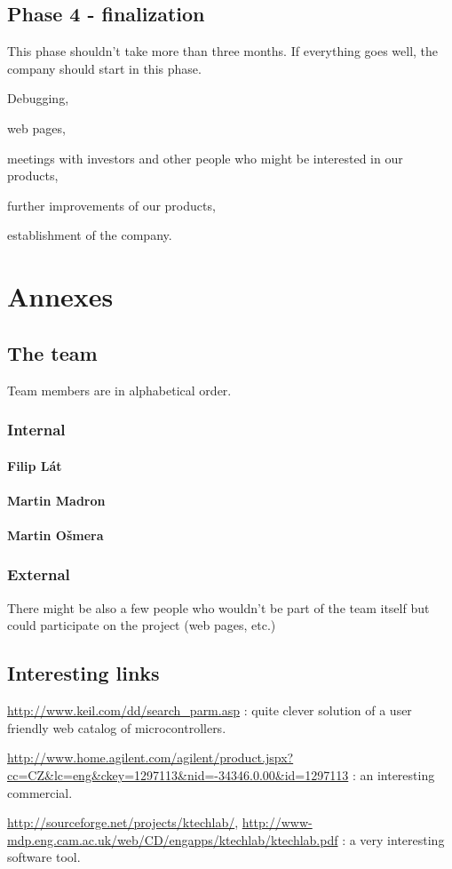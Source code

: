 \documentclass[a4paper,twoside,15pt]{book}
\begin{document}
	\section{Phase 4 - finalization}
		This phase shouldn't take more than three months.
		If everything goes well, the company should start in this phase.
		\begin{dinglist}{73}
			\item Debugging,
			\item web pages,
			\item meetings with investors and other people who might be interested in our products,
			\item further improvements of our products,
			\item establishment of the company.
		\end{dinglist}

\chapter{Annexes}
	\section{The team}
		Team members are in alphabetical order.
		\subsection{Internal}
			\subsubsection{Filip Lát}
			\subsubsection{Martin Madron}
			\subsubsection{Martin Ošmera}
		\subsection{External}
			There might be also a few people who wouldn't be part of the team itself but could participate on the project (web pages, etc.)

	\section{Interesting links}
		\begin{dinglist}{73}
			\item \url{http://www.keil.com/dd/search_parm.asp} : quite clever solution of a user friendly web catalog of microcontrollers.
			\item \url{http://www.home.agilent.com/agilent/product.jspx?cc=CZ&lc=eng&ckey=1297113&nid=-34346.0.00&id=1297113} : an interesting commercial.
			\item \url{http://sourceforge.net/projects/ktechlab/}, \url{http://www-mdp.eng.cam.ac.uk/web/CD/engapps/ktechlab/ktechlab.pdf} : a very  interesting software tool.
		\end{dinglist}
\end{document}
